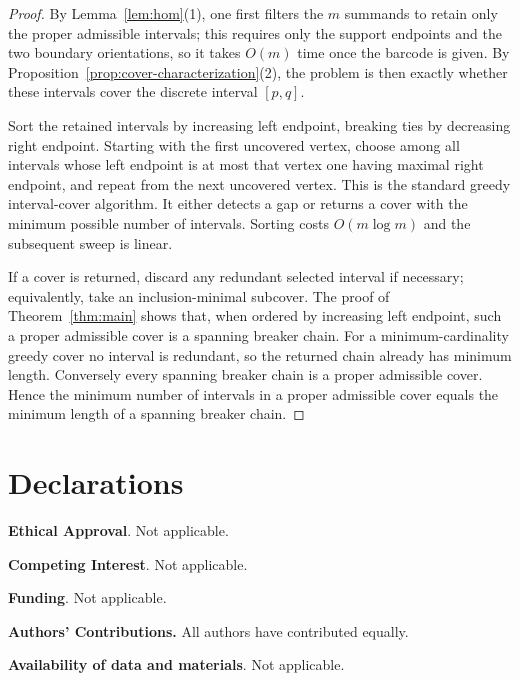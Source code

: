 \documentclass[11pt]{amsart}
\numberwithin{equation}{section}
\theoremstyle{definition}
\begin{document}
\begin{proof}
By Lemma~\ref{lem:hom}(1), one first filters the $m$ summands to retain only
the proper admissible intervals; this requires only the support endpoints and
the two boundary orientations, so it takes $O(m)$ time once the barcode is
given.  By Proposition~\ref{prop:cover-characterization}(2), the problem is
then exactly whether these intervals cover the discrete interval $[p,q]$.

Sort the retained intervals by increasing left endpoint, breaking ties by
decreasing right endpoint.  Starting with the first uncovered vertex, choose
among all intervals whose left endpoint is at most that vertex one having
maximal right endpoint, and repeat from the next uncovered vertex.  This is
the standard greedy interval-cover algorithm.  It either detects a gap or
returns a cover with the minimum possible number of intervals.  Sorting costs
$O(m\log m)$ and the subsequent sweep is linear.

If a cover is returned, discard any redundant selected interval if necessary;
equivalently, take an inclusion-minimal subcover.  The proof of
Theorem~\ref{thm:main} shows that, when ordered by increasing left endpoint,
such a proper admissible cover is a spanning breaker chain.  For a
minimum-cardinality greedy cover no interval is redundant, so the returned
chain already has minimum length.  Conversely every spanning breaker chain
is a proper admissible cover.  Hence the minimum number of intervals in a
proper admissible cover equals the minimum length of a spanning breaker
chain.
\end{proof}


\section*{Declarations} 

{\bf Ethical Approval}. Not applicable.

{\bf Competing Interest}. Not applicable. 

	
{\bf Funding}. Not applicable.

{\bf Authors' Contributions.} All authors have contributed equally. 

{\bf Availability of data and materials}. Not applicable.
\end{document}
